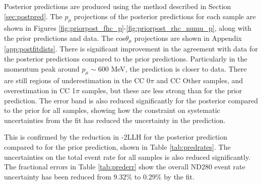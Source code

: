 Posterior predictions are produced using the method described in Section \ref{sec:postpred}. The $p_{\mu}$ projections of the posterior predictions for each sample are shown in Figures \ref{fig:priorpost_fhc_p}-\ref{fig:priorpost_rhc_numu_p}, along with the prior predictions and data. The cos$\theta_{\mu}$ projections are shown in Appendix \ref{app:postfitdists}. There is significant improvement in the agreement with data for the posterior predictions compared to the prior predictions. Particularly in the momentum peak around $p_{\mu}\sim$600 MeV, the prediction is closer to data. There are still regions of underestimation in the CC 0$\pi$ and CC Other samples, and overestimation in CC 1$\pi$ samples, but these are less strong than for the prior prediction. The error band is also reduced significantly for the posterior compared to the prior for all samples, showing how the constraint on systematic uncertainties from the fit has reduced the uncertainty in the prediction. 

This is confirmed by the reduction in -2LLH for the posterior prediction compared to for the prior prediction, shown in Table \ref{tab:predrates}. The uncertainties on the total event rate for all samples is also reduced significantly. The fractional errors in Table \ref{tab:prederr} show the overall ND280 event rate uncertainty has been reduced from $9.32\%$ to $0.29\%$ by the fit.

